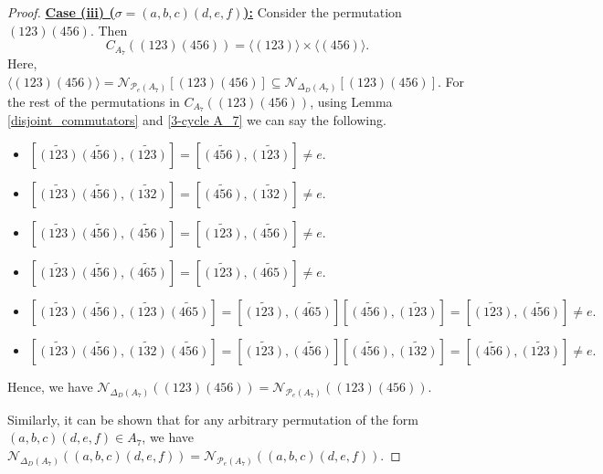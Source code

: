 \documentclass[12pt,a4paper]{article}
\begin{document}
\begin{proof}
\vspace{.3cm}
\noindent\underline{\bf{Case (iii) ($\sigma=(a,b,c)(d,e,f)$):}} Consider the permutation $(123)(456)$. Then \[C_{A_7}((123)(456))=\langle(123)\rangle\times\langle(456)\rangle.\] Here, $\langle(123)(456)\rangle=\mathcal{N}_{\mathcal{P}_e(A_7)}[(123)(456)]\subseteq\mathcal{N}_{\Delta_D(A_7)}[(123)(456)]$. For the rest of the permutations in $C_{A_7}((123)(456))$, using Lemma \ref{disjoint_commutators} and \ref{3-cycle A_7} we can say the following.
\begin{itemize}
    \item $[\tilde{(123)}\tilde{(456)},\tilde{(123)}]=[\tilde{(456)},\tilde{(123)}]\neq e.$
    \item $[\tilde{(123)}\tilde{(456)},\tilde{(132)}]=[\tilde{(456)},\tilde{(132)}]\neq e.$
    \item $[\tilde{(123)}\tilde{(456)},\tilde{(456)}]=[\tilde{(123)},\tilde{(456)}]\neq e.$
    \item $[\tilde{(123)}\tilde{(456)},\tilde{(465)}]=[\tilde{(123)},\tilde{(465)}]\neq e.$
    \item $[\tilde{(123)}\tilde{(456)},\tilde{(123)}\tilde{(465)}]=[\tilde{(123)},\tilde{(465)}][\tilde{(456)},\tilde{(123)}]=[\tilde{(123)},\tilde{(456)}]\neq e.$
    \item $[\tilde{(123)}\tilde{(456)},\tilde{(132)}\tilde{(456)}]=[\tilde{(123)},\tilde{(456)}][\tilde{(456)},\tilde{(132)}]=[\tilde{(456)},\tilde{(123)}]\neq e.$
\end{itemize}
Hence, we have $\mathcal{N}_{\Delta_D(A_7)}((123)(456))=\mathcal{N}_{\mathcal{P}_e(A_7)}((123)(456))$.

Similarly, it can be shown that for any arbitrary permutation of the form $(a,b,c)(d,e,f)\in A_7$, we have $\mathcal{N}_{\Delta_D(A_7)}((a,b,c)(d,e,f))=\mathcal{N}_{\mathcal{P}_e(A_7)}((a,b,c)(d,e,f))$.


\end{proof}
\end{document}
